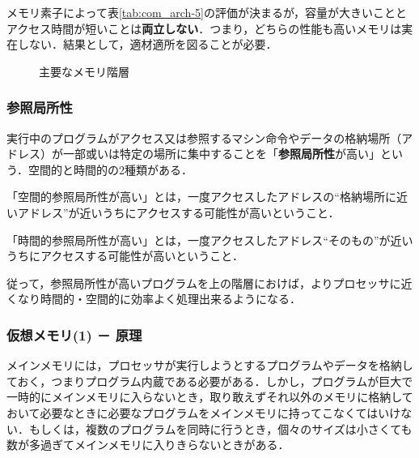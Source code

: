 メモリ素子によって表\ref{tab:com_arch-5}の評価が決まるが，容量が大きいこととアクセス時間が短いことは\textbf{両立しない}．つまり，どちらの性能も高いメモリは実在しない．結果として，適材適所を図ることが必要．

\begin{figure}[H]
	\begin{center}
		\caption{主要なメモリ階層}
		\label{fig:com_arch-6}
	\end{center}
\end{figure}



\subsubsection{参照局所性}\label{sec:com_arch-2-D-4}

実行中のプログラムがアクセス又は参照するマシン命令やデータの格納場所（アドレス）が一部或いは特定の場所に集中することを「\textbf{参照局所性}が高い」という．空間的と時間的の2種類がある．
\begin{enumerate}[label=\textbf{[\arabic*]}, labelsep=10pt, leftmargin=23pt]
	\item 「空間的参照局所性が高い」とは，一度アクセスしたアドレスの“格納場所に近いアドレス”が近いうちにアクセスする可能性が高いということ．
	\item 「時間的参照局所性が高い」とは，一度アクセスしたアドレス“そのもの”が近いうちにアクセスする可能性が高いということ．
\end{enumerate}

従って，参照局所性が高いプログラムを上の階層におけば，よりプロセッサに近くなり時間的・空間的に効率よく処理出来るようになる．



\subsubsection{仮想メモリ(1) － 原理}\label{sec:com_arch-2-D-5}

メインメモリには，プロセッサが実行しようとするプログラムやデータを格納しておく，つまりプログラム内蔵である必要がある．しかし，プログラムが巨大で一時的にメインメモリに入らないとき，取り敢えずそれ以外のメモリに格納しておいて必要なときに必要なプログラムをメインメモリに持ってこなくてはいけない．もしくは，複数のプログラムを同時に行うとき，個々のサイズは小さくても数が多過ぎてメインメモリに入りきらないときがある．

